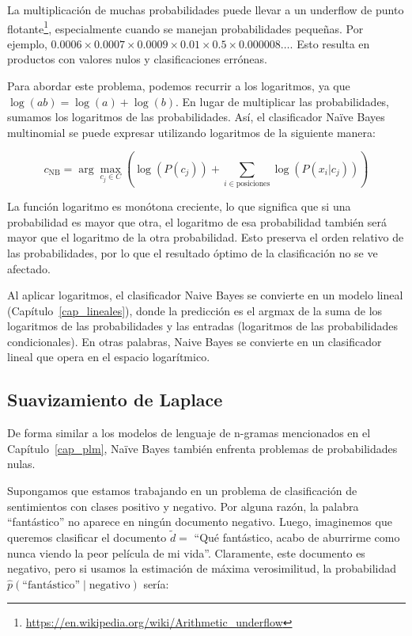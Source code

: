 La multiplicación de muchas probabilidades puede llevar a un underflow de punto flotante\footnote{\url{https://en.wikipedia.org/wiki/Arithmetic_underflow}}, especialmente cuando se manejan probabilidades pequeñas. Por ejemplo, $0.0006 \times 0.0007 \times 0.0009 \times 0.01 \times 0.5 \times 0.000008 \ldots$. Esto resulta en productos con valores nulos y clasificaciones erróneas.

Para abordar este problema, podemos recurrir a los logaritmos, ya que $\log(ab) = \log(a) + \log(b)$. En lugar de multiplicar las probabilidades, sumamos los logaritmos de las probabilidades. Así, el clasificador Naïve Bayes multinomial se puede expresar utilizando logaritmos de la siguiente manera:

\[
c_{\text{NB}} = \arg\max_{c_j \in C} \left(\log(P(c_j)) + \sum_{i \in \text{posiciones}} \log(P(x_i | c_j))\right)
\]

La función logaritmo es monótona creciente, lo que significa que si una probabilidad es mayor que otra, el logaritmo de esa probabilidad también será mayor que el logaritmo de la otra probabilidad. Esto preserva el orden relativo de las probabilidades, por lo que el resultado óptimo de la clasificación no se ve afectado.

Al aplicar logaritmos, el clasificador Naive Bayes se convierte en un modelo lineal (Capítulo~\ref{cap_lineales}), donde la predicción es el argmax de la suma de los logaritmos de las probabilidades y las entradas (logaritmos de las probabilidades condicionales). En otras palabras, Naive Bayes se convierte en un clasificador lineal que opera en el espacio logarítmico.

\subsection{Suavizamiento de Laplace}

De forma similar a los modelos de lenguaje de n-gramas mencionados en el Capítulo~\ref{cap_plm}, Naïve Bayes también enfrenta problemas de probabilidades nulas.

Supongamos que estamos trabajando en un problema de clasificación de sentimientos con clases positivo y negativo. Por alguna razón, la palabra ``fantástico'' no aparece en ningún documento negativo. Luego, imaginemos que queremos clasificar el documento $\tilde{d}=$ ``Qué fantástico, acabo de aburrirme como nunca viendo la peor película de mi vida''. Claramente, este documento es negativo, pero si usamos la estimación de máxima verosimilitud, la probabilidad $\hat{p}(\text{``fantástico''} \mid \text{negativo})$ sería:

